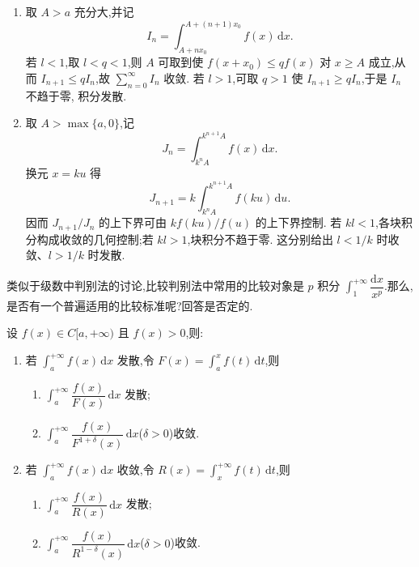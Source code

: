 \begin{solution}
  \begin{enumerate}
    \item 取 $A>a$ 充分大,并记
          \[
            I_n=\int_{A+nx_0}^{A+(n+1)x_0}f(x)\,\mathrm{d}x.
          \]
          若 $l<1$,取 $l<q<1$,则 $A$ 可取到使
          $f(x+x_0)\leq qf(x)$ 对 $x\geq A$ 成立,从而
          $I_{n+1}\leq qI_n$,故 $\displaystyle\sum\limits_{n=0}^{\infty}I_n$ 收敛.
          若 $l>1$,可取 $q>1$ 使 $I_{n+1}\geq qI_n$,于是 $I_n$ 不趋于零,
          积分发散.

    \item 取 $A>\max\{a,0\}$,记
          \[
            J_n=\int_{k^nA}^{k^{n+1}A}f(x)\,\mathrm{d}x.
          \]
          换元 $x=ku$ 得
          \[
            J_{n+1}=k\int_{k^nA}^{k^{n+1}A}f(ku)\,\mathrm{d}u.
          \]
          因而 $J_{n+1}/J_n$ 的上下界可由 $k f(ku)/f(u)$ 的上下界控制.
          若 $kl<1$,各块积分构成收敛的几何控制;若 $kl>1$,块积分不趋于零.
          这分别给出 $l<1/k$ 时收敛、$l>1/k$ 时发散.
  \end{enumerate}
\end{solution}

类似于级数中判别法的讨论,比较判别法中常用的比较对象是 $p$ 积分 $\displaystyle\int_1^{+\infty}\dfrac{\mathrm{d}x}{x^p}$.那么,是否有一个普遍适用的比较标准呢?回答是否定的.

\begin{proposition}[\markstar]
  设 $f(x)\in C\lbrack a,+\infty)$ 且 $f(x)>0$,则:
  \begin{enumerate}
    \item 若 $\displaystyle\int_a^{+\infty}f(x)\,\mathrm{d}x$ 发散,令 $\displaystyle F(x)=\int_a^xf(t)\,\mathrm{d}t$,则
          \begin{enumerate}
            \item $\displaystyle\int_a^{+\infty}\dfrac{f(x)}{F(x)}\,\mathrm{d}x$ 发散;
            \item $\displaystyle\int_a^{+\infty}\dfrac{f(x)}{F^{1+\delta}(x)}\,\mathrm{d}x$($\delta>0$)收敛.
          \end{enumerate}
    \item 若 $\displaystyle\int_a^{+\infty}f(x)\,\mathrm{d}x$ 收敛,令 $\displaystyle R(x)=\int_x^{+\infty}f(t)\,\mathrm{d}t$,则
          \begin{enumerate}
            \item $\displaystyle\int_a^{+\infty}\dfrac{f(x)}{R(x)}\,\mathrm{d}x$ 发散;
            \item $\displaystyle\int_a^{+\infty}\dfrac{f(x)}{R^{1-\delta}(x)}\,\mathrm{d}x$($\delta>0$)收敛.
          \end{enumerate}
  \end{enumerate}
\end{proposition}



